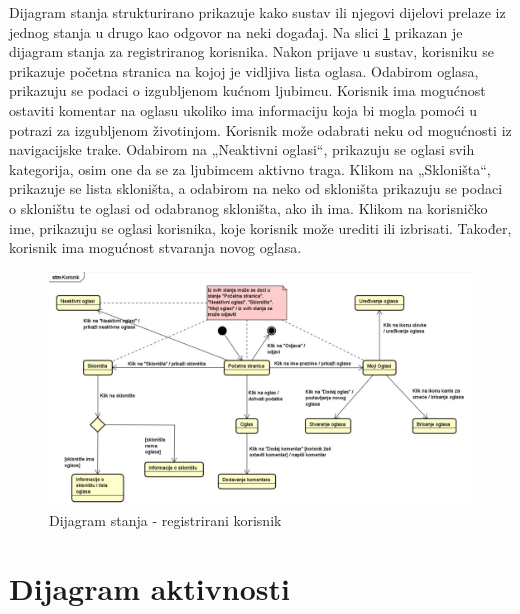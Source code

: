 			Dijagram stanja strukturirano prikazuje kako sustav ili njegovi dijelovi prelaze iz jednog stanja u drugo kao odgovor na neki događaj. Na slici \ref{fig:dijagramstanja} prikazan je dijagram stanja za registriranog korisnika. Nakon prijave u sustav, korisniku se prikazuje početna stranica na kojoj je vidljiva lista oglasa. Odabirom oglasa, prikazuju se podaci o izgubljenom kućnom ljubimcu. Korisnik ima mogućnost ostaviti komentar na oglasu ukoliko ima informaciju koja bi mogla pomoći u potrazi za izgubljenom životinjom. Korisnik može odabrati neku od mogućnosti iz navigacijske trake. Odabirom na „Neaktivni oglasi“, prikazuju se oglasi svih kategorija, osim one da se za ljubimcem aktivno traga. Klikom na „Skloništa“, prikazuje se lista skloništa, a odabirom na neko od skloništa prikazuju se podaci o skloništu te oglasi od odabranog skloništa, ako ih ima. Klikom na korisničko ime, prikazuju se oglasi korisnika, koje korisnik može urediti ili izbrisati. Također, korisnik ima mogućnost stvaranja novog oglasa.
			
			\begin{figure}[H]
				\includegraphics[width=\textwidth]{dijagram_stanja.JPEG}
				\centering
				\caption{Dijagram stanja - registrirani korisnik}
				\label{fig:dijagramstanja}
			\end{figure}
			
			
			\eject 
		
		\section{Dijagram aktivnosti}
			
			
			 
